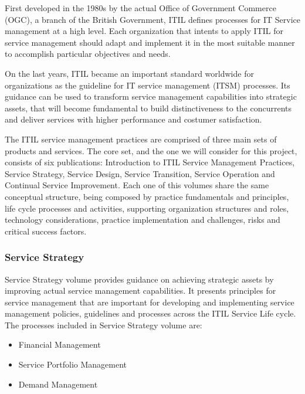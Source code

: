 First developed in the 1980s by the actual Office of Government Commerce (OGC), a branch of the British Government, ITIL defines processes for IT Service management at a high level. Each organization that intents to apply ITIL for service management should adapt and implement it in the most suitable manner to accomplish  particular objectives and needs.\cite{hill2006combine}\par
On the last years, ITIL became an important standard worldwide for organizations as the guideline for IT service management (ITSM) processes. Its guidance can be used to transform service management capabilities into strategic assets, that will become fundamental to build distinctiveness to the concurrents and deliver services with higher performance and costumer satisfaction.\par
The ITIL service management practices are comprised of three main sets of products and services. The core set, and the one we will consider for this project, consists of six publications: Introduction to ITIL Service Management Practices, Service Strategy, Service Design, Service Transition, Service Operation and Continual Service Improvement. Each one of this volumes share the same conceptual structure, being composed by practice fundamentals and principles, life cycle processes and activities, supporting organization structures and roles, technology considerations, practice implementation and challenges, risks and critical success factors.\par

\subsubsection{Service Strategy} 

Service Strategy volume provides guidance on achieving strategic assets by improving actual service management capabilities. It presents principles for service management that are important for developing and implementing service management policies, guidelines and processes across the ITIL Service Life cycle.\cite{itilSS} The processes included in Service Strategy volume are:

\begin{itemize}
  \item Financial Management
  \item Service Portfolio Management 
  \item Demand Management
\end{itemize}

